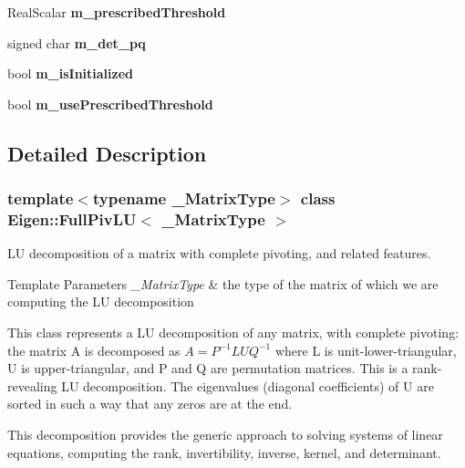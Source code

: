 \begin{DoxyCompactItemize}
\mbox{\label{class_eigen_1_1_full_piv_l_u_a038301ef1afa7359095f320e7585c42a}} 
Real\+Scalar {\bfseries m\+\_\+prescribed\+Threshold}
\item 
\mbox{\label{class_eigen_1_1_full_piv_l_u_a0ef883d134b4b6b03453b87d9d27cc54}} 
signed char {\bfseries m\+\_\+det\+\_\+pq}
\item 
\mbox{\label{class_eigen_1_1_full_piv_l_u_aba2dab012169688780fc50509d38a3f5}} 
bool {\bfseries m\+\_\+is\+Initialized}
\item 
\mbox{\label{class_eigen_1_1_full_piv_l_u_a9d5ab07b54c7bb0cb9e2e13e770308cd}} 
bool {\bfseries m\+\_\+use\+Prescribed\+Threshold}
\end{DoxyCompactItemize}


\subsection{Detailed Description}
\subsubsection*{template$<$typename \+\_\+\+Matrix\+Type$>$\newline
class Eigen\+::\+Full\+Piv\+L\+U$<$ \+\_\+\+Matrix\+Type $>$}

LU decomposition of a matrix with complete pivoting, and related features. 


\begin{DoxyTemplParams}{Template Parameters}
{\em \+\_\+\+Matrix\+Type} & the type of the matrix of which we are computing the LU decomposition\\
\hline
\end{DoxyTemplParams}
This class represents a LU decomposition of any matrix, with complete pivoting\+: the matrix A is decomposed as $ A = P^{-1} L U Q^{-1} $ where L is unit-\/lower-\/triangular, U is upper-\/triangular, and P and Q are permutation matrices. This is a rank-\/revealing LU decomposition. The eigenvalues (diagonal coefficients) of U are sorted in such a way that any zeros are at the end.

This decomposition provides the generic approach to solving systems of linear equations, computing the rank, invertibility, inverse, kernel, and determinant.

